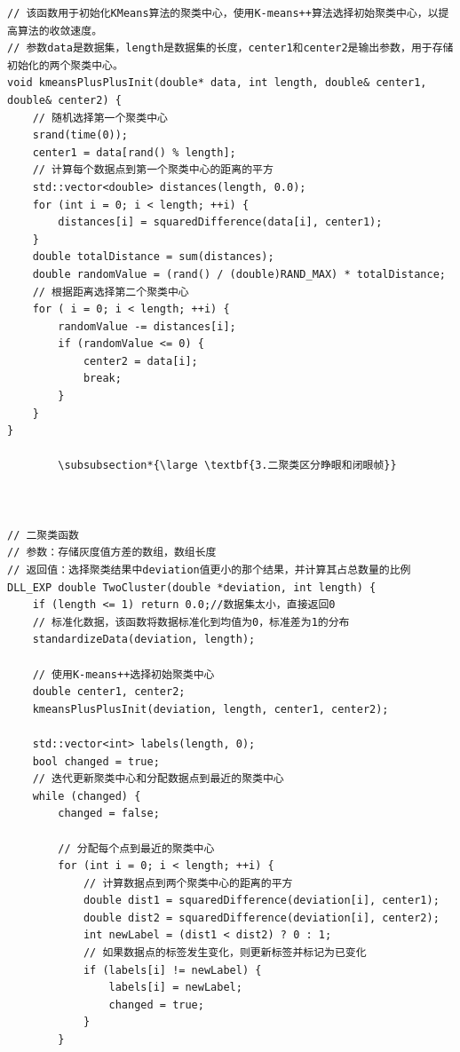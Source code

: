 \documentclass[12pt,hyperref,a4paper,UTF8]{ctexart}
\begin{document}
        \begin{lstlisting}[caption={kmeans算法}, label={lst:example}]
// 该函数用于初始化KMeans算法的聚类中心，使用K-means++算法选择初始聚类中心，以提高算法的收敛速度。
// 参数data是数据集，length是数据集的长度，center1和center2是输出参数，用于存储初始化的两个聚类中心。
void kmeansPlusPlusInit(double* data, int length, double& center1, double& center2) {
    // 随机选择第一个聚类中心
    srand(time(0));
    center1 = data[rand() % length];
    // 计算每个数据点到第一个聚类中心的距离的平方
    std::vector<double> distances(length, 0.0);
    for (int i = 0; i < length; ++i) {
        distances[i] = squaredDifference(data[i], center1);
    }
    double totalDistance = sum(distances);
    double randomValue = (rand() / (double)RAND_MAX) * totalDistance;
    // 根据距离选择第二个聚类中心
    for ( i = 0; i < length; ++i) {
        randomValue -= distances[i];
        if (randomValue <= 0) {
            center2 = data[i];
            break;
        }
    }
}

        \subsubsection*{\large \textbf{3.二聚类区分睁眼和闭眼帧}}



// 二聚类函数
// 参数：存储灰度值方差的数组，数组长度
// 返回值：选择聚类结果中deviation值更小的那个结果，并计算其占总数量的比例
DLL_EXP double TwoCluster(double *deviation, int length) {
    if (length <= 1) return 0.0;//数据集太小，直接返回0
    // 标准化数据，该函数将数据标准化到均值为0，标准差为1的分布
    standardizeData(deviation, length);

    // 使用K-means++选择初始聚类中心
    double center1, center2;
    kmeansPlusPlusInit(deviation, length, center1, center2);

    std::vector<int> labels(length, 0);
    bool changed = true;
    // 迭代更新聚类中心和分配数据点到最近的聚类中心
    while (changed) {
        changed = false;

        // 分配每个点到最近的聚类中心
        for (int i = 0; i < length; ++i) {
            // 计算数据点到两个聚类中心的距离的平方
            double dist1 = squaredDifference(deviation[i], center1);
            double dist2 = squaredDifference(deviation[i], center2);
            int newLabel = (dist1 < dist2) ? 0 : 1;
            // 如果数据点的标签发生变化，则更新标签并标记为已变化
            if (labels[i] != newLabel) {
                labels[i] = newLabel;
                changed = true;
            }
        }


\end{lstlisting}
\end{document}
